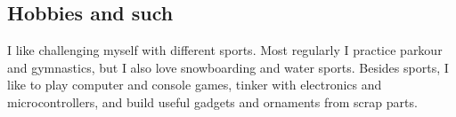 \documentclass[letterpaper]{twentysecondcv}
\begin{document}
\subsection{Hobbies and such}

  I like challenging myself with different sports.
  Most regularly I practice parkour and gymnastics,
  but I also love snowboarding and water sports.
  Besides sports, I like to play computer and console games,
  tinker with electronics and micro\-controllers,
  and build useful gadgets and ornaments from scrap parts.










\end{document}
